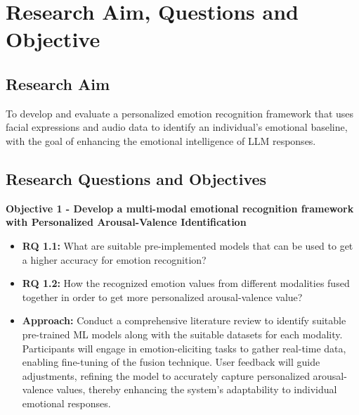 \section{Research Aim, Questions and Objective}
\label{sec:research-aim-questions-objectives}

\subsection{Research Aim}
\label{subsec:research-aim}
\par To develop and evaluate a personalized emotion recognition framework that uses facial expressions and audio data to identify an individual's emotional baseline, with the goal of enhancing the emotional intelligence of LLM responses.

\subsection{Research Questions and Objectives}
\label{subsec:research-questions-objectives}

\textbf{Objective 1 - Develop a multi-modal emotional recognition framework with Personalized Arousal-Valence Identification}
\label{obj:1}    
\begin{itemize}
    \item \textbf{RQ 1.1:}\label{rq:1.1} What are suitable pre-implemented models that can be used to get a higher accuracy for emotion recognition?

    \item \textbf{RQ 1.2:}\label{rq:1.2} How the recognized emotion values from different modalities fused together in order to get more personalized arousal-valence value?
      
    \item \textbf{Approach:} Conduct a comprehensive literature review to identify suitable pre-trained ML models along with the suitable datasets for each modality. Participants will engage in emotion-eliciting tasks to gather real-time data, enabling fine-tuning of the fusion technique. User feedback will guide adjustments, refining the model to accurately capture personalized arousal-valence values, thereby enhancing the system's adaptability to individual emotional responses.
\end{itemize}

